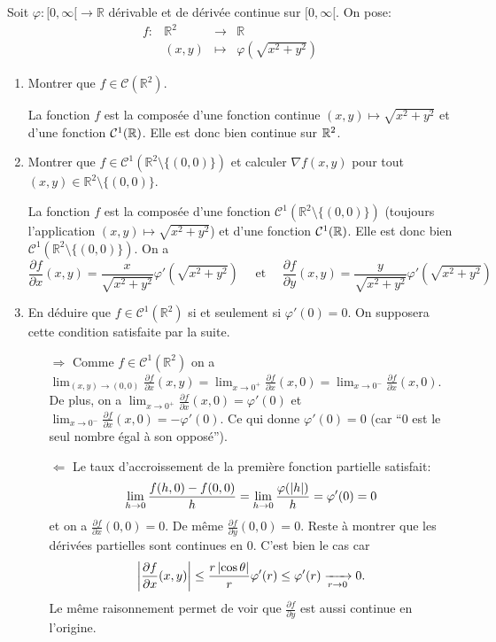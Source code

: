 \documentclass[a4paper]{tp_um}
\begin{document}
\exo{}
Soit $\varphi : [0,\infty[ \to \mathbb R$ d\'erivable et de d\'eriv\'ee continue sur $[0,\infty[$. 
On pose:
\[
\begin{array}{rrcl}
f  : & \mathbb R^2 & \longrightarrow & \mathbb R  \\
		& (x,y) & \longmapsto & \varphi(\sqrt{x^2+y^2})
\end{array}
\]
\begin{enumerate}
\item Montrer que $f \in \mathcal C(\mathbb R^2)$.

\medskip

La fonction $f$ est la composée d'une fonction continue $(x,y) \mapsto \sqrt{x^2 + y^2}$ et d'une fonction $\mathcal C^1(\mathbb{R})$. Elle est donc bien continue sur $\mathbb{R}^2$.

\medskip

\item Montrer que $f \in \mathcal C^1(\mathbb R^2 \setminus \{(0,0)\})$ et calculer $\nabla f(x,y)$
pour tout $(x,y) \in \mathbb R^2 \setminus \{(0,0)\}$.

\medskip
La fonction $f$ est la composée d'une fonction $\mathcal C^1(\mathbb R^2 \setminus \{(0,0)\})$ (toujours l'application $(x,y) \mapsto \sqrt{x^2 + y^2}$) et d'une fonction $\mathcal C^1(\mathbb{R})$. Elle est donc bien $\mathcal C^1(\mathbb R^2 \setminus \{(0,0)\})$. On a
\[
    \frac{\partial f}{\partial x} (x,y) = \frac{x}{\sqrt{x^2+y^2}} \varphi'(\sqrt{x^2 + y^2}) \quad \text{ et } \quad \frac{\partial f}{\partial y} (x,y) = \frac{y}{\sqrt{x^2+y^2}} \varphi'(\sqrt{x^2 + y^2})
\]

\medskip

\item En d\'eduire que $f \in \mathcal C^{1}(\mathbb R^2)$  si et seulement si $\varphi'(0) = 0.$
On supposera cette condition satisfaite par la suite.

\medskip

\begin{itemize}
    \item[$\Rightarrow$] Comme $f\in \mathcal C^{1}(\mathbb R^2)$ on a $\lim_{(x,y) \to (0,0)} \frac{\partial f}{\partial x} (x,y) =\lim_{x\to 0^+}\frac{\partial f}{\partial x} (x,0) = \lim_{x\to 0^-}\frac{\partial f}{\partial x} (x,0)$. De plus, on a $\lim_{x\to 0^+}\frac{\partial f}{\partial x} (x,0) = \varphi'(0)$ et $\lim_{x\to 0^-}\frac{\partial f}{\partial x} (x,0) = -\varphi'(0)$. Ce qui donne $\varphi'(0) = 0$ (car ``0 est le seul nombre égal à son opposé'').
    \item [$\Leftarrow$]  Le taux d'accroissement de la première fonction partielle satisfait:
\[
    \lim_{h\to 0} \frac{f(h,0) - f(0,0)}{h} = \lim_{h\to 0} \frac{\varphi(\left\lvert h\right\rvert)}{h} = \varphi'(0) = 0
\]
et on a $ \frac{\partial f}{\partial x}(0,0) =0$. De même $ \frac{\partial f}{\partial y} (0,0) =0$.  Reste à montrer que les dérivées partielles sont continues en 0. C'est bien le cas car 
\[
    \left\lvert\frac{\partial f}{\partial x} (x,y) \right\rvert \leq \frac{r\left\lvert\cos\theta\right\rvert }{r} \varphi'(r) \leq \varphi'(r) \xrightarrow[r\to 0]{} 0.
\]
Le même raisonnement permet de voir que $\frac{\partial f}{\partial y}$ est aussi continue en l'origine.
\end{itemize}
\medskip


\end{enumerate}
\end{document}
